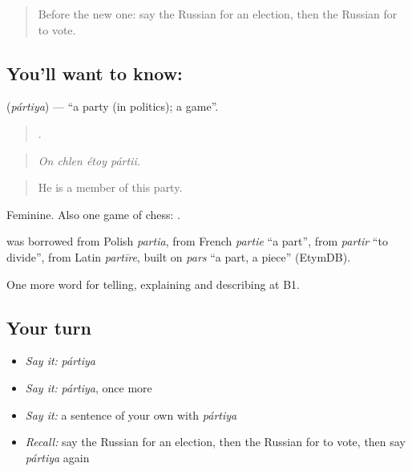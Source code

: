 \label{lesson:RU-C366-partiya}



\begin{quote}
Before the new one: say the Russian for an election, then the Russian for to vote.
\end{quote}

\subsection*{You'll want to know: }
\textbf{} (\emph{pártiya}) — \textquotedblleft{}a party (in politics); a game\textquotedblright{}.

\begin{quote}
   .
\end{quote}

\begin{quote}
\emph{On chlen étoy pártii.}
\end{quote}

\begin{quote}
He is a member of this party.
\end{quote}

Feminine. Also one game of chess: \emph{  }.

\begin{cousinweb}
\textbf{} was borrowed from Polish \emph{partia}, from French \emph{partie} \textquotedblleft{}a part\textquotedblright{}, from \emph{partir} \textquotedblleft{}to divide\textquotedblright{}, from Latin \emph{partīre}, built on \emph{pars} \textquotedblleft{}a part, a piece\textquotedblright{} (EtymDB).
\end{cousinweb}

\begin{grammarlens}[title={What you've built}]
One more word for telling, explaining and describing at B1.
\end{grammarlens}

\subsection*{Your turn}
\begin{itemize}
\raggedright
  \item \emph{Say it:} \emph{pártiya}
  \item \emph{Say it:} \emph{pártiya}, once more
  \item \emph{Say it:} a sentence of your own with \emph{pártiya}
  \item \emph{Recall:} say the Russian for an election, then the Russian for to vote, then say \emph{pártiya} again
\end{itemize}


